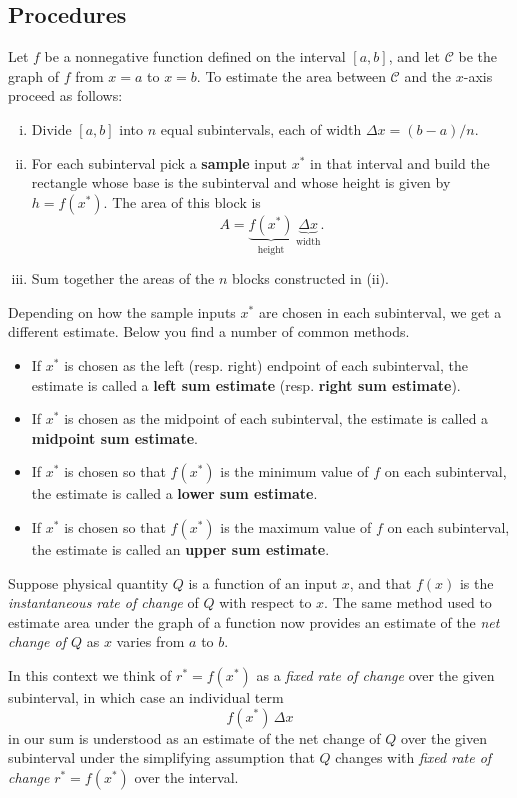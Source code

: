\subsection*{Procedures}
\begin{namedtheorem} Let $f$ be a nonnegative function defined on the interval $[a,b]$, and let $\mathcal{C}$ be the graph of $f$ from $x=a$ to $x=b$. To estimate the area between $\mathcal{C}$ and the $x$-axis proceed as follows:
  \begin{enumerate}[(i),itemsep=0pt,topsep=0pt]
    \item Divide $[a,b]$ into $n$ equal subintervals, each of width $\Delta x=(b-a)/n$.
    \item For each subinterval pick a {\bf sample} input $x^*$ in that interval and build the rectangle whose base is the subinterval and whose height is given by $h=f(x^*)$. The area of this block is
    \[
    A=\underset{\text{height}}{\underbrace{f(x^*)}}\,\underset{\text{width}}{\underbrace{\Delta x}}.
    \]
    \item Sum together the areas of the $n$ blocks constructed in (ii).
  \end{enumerate}
Depending on how the sample inputs $x^*$ are chosen in each subinterval, we get a different estimate. Below you find a number of  common methods.
\begin{itemize}[itemsep=0pt, topsep=0pt]
  \item If $x^*$ is chosen as the left (resp. right) endpoint of each subinterval, the estimate is called a {\bf left sum estimate} (resp. {\bf right sum estimate}).
  \item If $x^*$ is chosen as the midpoint of each subinterval, the estimate is called a {\bf midpoint sum estimate}.
  \item If $x^*$ is chosen so that $f(x^*)$ is the minimum value of $f$ on each subinterval, the estimate is called a {\bf lower sum estimate}.
  \item If $x^*$ is chosen so that $f(x^*)$ is the maximum value of $f$ on each subinterval, the estimate is called an {\bf upper sum estimate}.

\end{itemize}

\end{namedtheorem}
\begin{namedtheorem} Suppose physical quantity $Q$ is a function of an input $x$, and that $f(x)$ is the {\em instantaneous rate of change} of $Q$ with respect to $x$. The same method used to estimate area under the graph of a function now provides an estimate of the {\em net change of $Q$} as $x$ varies from $a$ to $b$.

\noindent
In this context we think of $r^*=f(x^*)$ as a {\em fixed rate of change} over the given subinterval, in which case an individual term
\[
f(x^*)\, \Delta x
\]
in our sum is understood as an estimate of the net change of $Q$ over the given subinterval under the simplifying assumption that $Q$ changes with {\em fixed rate of change} $r^*=f(x^*)$ over the interval.

\end{namedtheorem}
